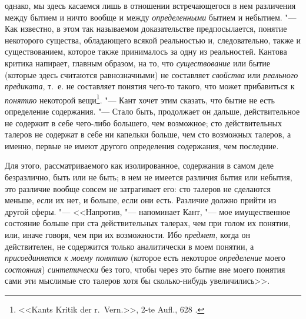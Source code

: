однако, мы здесь касаемся лишь в отношении встречающегося в нем различения
между бытием и ничто вообще и между {\em определенными}
бытием и небытием. "--- Как известно, в этом так называемом доказательстве
предпосылается, понятие некоторого существа, обладающего всякой реальностью
и, следовательно, также и существованием, которое также принималось за одну
из реальностей. Кантова критика напирает, главным образом, на то, что
{\em существование} или бытие (которые здесь считаются
равнозначными) не составляет {\em свойства} или
{\em реального предиката}, т.~е. не составляет понятия
чего-то такого, что может прибавиться к {\em понятию}
некоторой вещи\footnote{ <<Kants Kritik der r.~Vern.>>, 2-te Aufl., 628
.}.
"--- Кант хочет этим сказать, что бытие не
есть определение содержания. "--- Стало быть, продолжает он дальше,
действительное не содержит в себе чего-либо большего, чем возможное; сто
действительных талеров не содержат в себе ни капельки больше, чем сто
возможных талеров, а именно, первые не имеют другого определения
содержания, чем последние.

Для этого, рассматриваемого как изолированное, содержания в самом деле
безразлично, быть или не быть; в нем не имеется различия бытия или небытия,
это различие вообще совсем не затрагивает его: сто талеров не сделаются
меньше, если их нет, и больше, если они есть. Различие должно прийти из
другой сферы. "--- <<Напротив, "--- напоминает Кант, "--- мое имущественное состояние
больше при ста действительных талерах, чем при голом их понятии, или, иначе
говоря, чем при их возможности. Ибо {\em предмет},
когда он действителен, не содержится только аналитически в моем понятии, а
{\em присоединяется к моему понятию} (которое есть
некоторое {\em определение} моего
{\em состояния}) {\em синтетически}
без того, чтобы через это бытие вне моего понятия сами эти мыслимые сто
талеров хотя бы сколько-нибудь увеличились>>.

